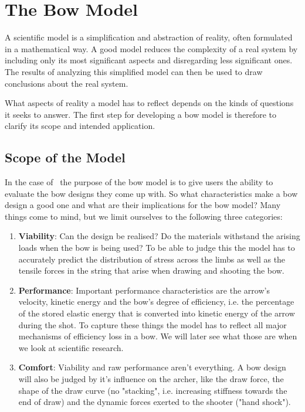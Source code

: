 \chapter{The Bow Model}

A scientific model is a simplification and abstraction of reality, often formulated in a mathematical way.
A good model reduces the complexity of a real system by including only its most significant aspects and disregarding less significant ones.
The results of analyzing this simplified model can then be used to draw conclusions about the real system.

What aspects of reality a model has to reflect depends on the kinds of questions it seeks to answer.
The first step for developing a bow model is therefore to clarify its scope and intended application.

\section{Scope of the Model}
\label{section:model-scope}

In the case of \swtitle\ the purpose of the bow model is to give users the ability to evaluate the bow designs they come up with.
So what characteristics make a bow design a good one and what are their implications for the bow model?
Many things come to mind, but we limit ourselves to the following three categories:

\begin{enumerate}
\item \textbf{Viability}: Can the design be realised? Do the materials withstand the arising loads when the bow is being used?
To be able to judge this the model has to accurately predict the distribution of stress across the limbs as well as the tensile forces in the string that arise when drawing and shooting the bow.

\item \textbf{Performance}: Important performance characteristics are the arrow's velocity, kinetic energy and the bow's degree of efficiency, i.e. the percentage of the stored elastic energy that is converted into kinetic energy of the arrow during the shot.
To capture these things the model has to reflect all major mechanisms of efficiency loss in a bow.
We will later see what those are when we look at scientific research.

\item \textbf{Comfort}: Viability and raw performance aren't everything.
A bow design will also be judged by it's influence on the archer, like the draw force, the shape of the draw curve (no "stacking", i.e. increasing stiffness towards the end of draw) and the dynamic forces exerted to the shooter ("hand shock").
\end{enumerate}

